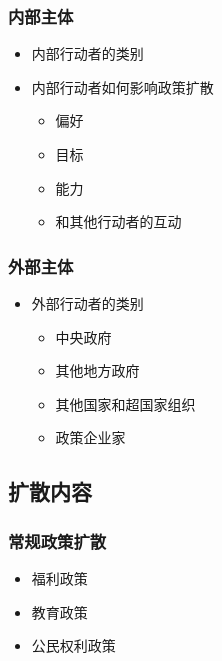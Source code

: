 \documentclass[
  12pt,
]{ctexart}
\begin{document}
\hypertarget{ux5185ux90e8ux4e3bux4f53}{%
\subsubsection{内部主体}\label{ux5185ux90e8ux4e3bux4f53}}

\begin{itemize}
\item
  内部行动者的类别
\item
  内部行动者如何影响政策扩散

  \begin{itemize}
  \item
    偏好
  \item
    目标
  \item
    能力
  \item
    和其他行动者的互动
  \end{itemize}
\end{itemize}

\hypertarget{ux5916ux90e8ux4e3bux4f53}{%
\subsubsection{外部主体}\label{ux5916ux90e8ux4e3bux4f53}}

\begin{itemize}
\item
  外部行动者的类别

  \begin{itemize}
  \item
    中央政府
  \item
    其他地方政府
  \item
    其他国家和超国家组织
  \item
    政策企业家
  \end{itemize}
\end{itemize}

\hypertarget{ux6269ux6563ux5185ux5bb9}{%
\subsection{扩散内容}\label{ux6269ux6563ux5185ux5bb9}}

\hypertarget{ux5e38ux89c4ux653fux7b56ux6269ux6563}{%
\subsubsection{常规政策扩散}\label{ux5e38ux89c4ux653fux7b56ux6269ux6563}}

\begin{itemize}
\item
  福利政策
\item
  教育政策
\item
  公民权利政策
\end{itemize}
\end{document}
